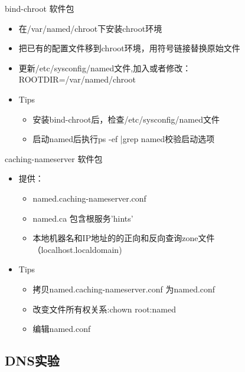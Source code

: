 \begin{frame}{bind-chroot 软件包}
\begin{itemize}
\item 在/var/named/chroot下安装chroot环境
\item 把已有的配置文件移到chroot环境，用符号链接替换原始文件
\item 更新/etc/sysconfig/named文件,加入或者修改：\\
ROOTDIR=/var/named/chroot
\item Tips

\begin{itemize}
\item 安装bind-chroot后，检查/etc/sysconfig/named文件
\item 启动named后执行ps -ef |grep named校验启动选项
\end{itemize}
\end{itemize}

\end{frame} 
\begin{frame}{caching-nameserver 软件包}
\begin{itemize}
\item 提供：

\begin{itemize}
\item named.caching-nameserver.conf
\item named.ca 包含根服务'hints'
\item 本地机器名和IP地址的的正向和反向查询zone文件（localhost.localdomain)
\end{itemize}
\item Tips

\begin{itemize}
\item 拷贝named.caching-nameserver.conf 为named.conf
\item 改变文件所有权关系:chown root:named
\item 编辑named.conf
\end{itemize}
\end{itemize}

\end{frame} 
\subsection{DNS实验}


